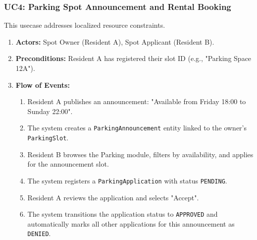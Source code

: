\subsubsection{UC4: Parking Spot Announcement and Rental Booking}
This usecase addresses localized resource constraints.
\begin{enumerate}
    \item \textbf{Actors:} Spot Owner (Resident A), Spot Applicant (Resident B).
    \item \textbf{Preconditions:} Resident A has registered their slot ID (e.g., "Parking Space 12A").
    \item \textbf{Flow of Events:}
    \begin{enumerate}
        \item Resident A publishes an announcement: "Available from Friday 18:00 to Sunday 22:00".
        \item The system creates a \texttt{ParkingAnnouncement} entity linked to the owner's \texttt{ParkingSlot}.
        \item Resident B browses the Parking module, filters by availability, and applies for the announcement slot.
        \item The system registers a \texttt{ParkingApplication} with status \texttt{PENDING}.
        \item Resident A reviews the application and selects "Accept".
        \item The system transitions the application status to \texttt{APPROVED} and automatically marks all other applications for this announcement as \texttt{DENIED}.
    \end{enumerate}
\end{enumerate}

